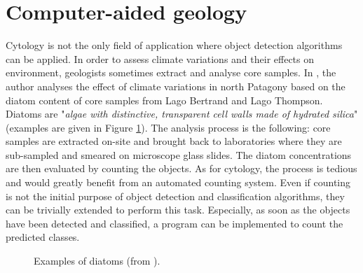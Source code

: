 \section{Computer-aided geology}
\label{sec:geology}
Cytology is not the only field of application where object detection algorithms can be applied. In order to assess climate variations and their effects on environment, geologists sometimes extract and analyse core samples. In  \cite{vsacre2011}, the author analyses the effect of climate variations in north Patagony based on the diatom content of core samples from Lago Bertrand and Lago Thompson. Diatoms are "\textit{algae with distinctive, transparent cell walls made of hydrated silica}" \cite{diatoms2016} (examples are given in Figure \ref{fig:diatoms}). The analysis process is the following: core samples are extracted on-site and brought back to laboratories where they are sub-sampled and smeared on microscope glass slides. The diatom concentrations are then evaluated by counting the objects. As for cytology, the process is tedious and would greatly benefit from an automated counting system. Even if counting is not the initial purpose of object detection and classification algorithms, they can be trivially extended to perform this task. Especially, as soon as the objects have been detected and classified, a program can be implemented to count the predicted classes.

\begin{figure}
	\center
	\caption{Examples of diatoms (from \cite{vsacre2011}).}
	\label{fig:diatoms}
\end{figure}